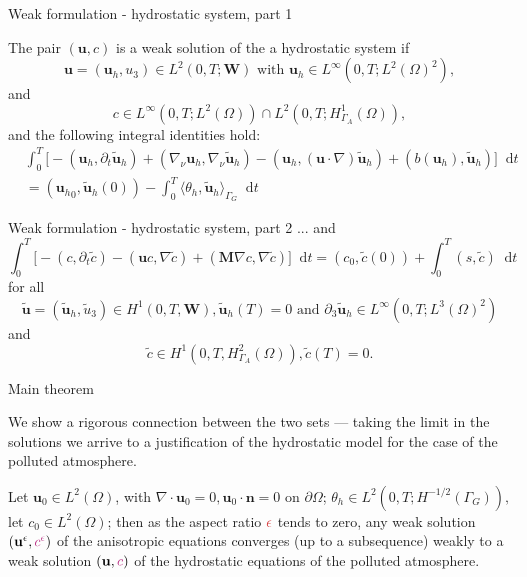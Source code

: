\documentclass{beamer}
\newcommand*\diff{\mathop{}\!\mathrm{d}}
\begin{document}
\begin{frame}{Weak formulation - hydrostatic system, part 1}

The pair $(\mathbf{u}, c)$ is a weak solution of the a hydrostatic system if
$$\mathbf{u} = (\mathbf{u}_h, u_3) \in L^2 (0, T; \mathbf{W}) \text{ with } \mathbf{u}_h \in L^\infty (0,T; L^2(\Omega)^2),$$
and
$$c \in L^\infty(0,T; L^2(\Omega)) \cap L^2(0,T; H^1_{\Gamma_A}(\Omega)),$$ and the following integral identities hold:
%
\begin{equation} \nonumber
\begin{split}
& \int_0^T \bigg[ -(\mathbf{u}_h, \partial_t \mathbf{\tilde{u}}_h) + (\nabla_\nu \mathbf{u}_h, \nabla_\nu \mathbf{\tilde{u}}_h) - (\mathbf{u}_h, (\mathbf{u} \cdot \nabla) \mathbf{\tilde{u}}_h) + (b(\mathbf{u}_h), \mathbf{\tilde{u}}_h) \bigg ] \diff t \\
& = ({\mathbf{u}_h}_0, \mathbf{\tilde{u}}_h(0)) - \int_0^T \langle \theta_h, \mathbf{\tilde{u}}_h \rangle_{\Gamma_G} \diff t
\end{split}
\end{equation}
%
\end{frame}

\begin{frame}{Weak formulation - hydrostatic system, part 2}
... and
%
\begin{equation} \nonumber
\int_0^T \bigg[ -(c, \partial_t \tilde{c}) -(\mathbf{u}c, \nabla \tilde{c}) +  (\mathbf{M} \nabla c, \nabla \tilde{c}) \bigg ] \diff t = (c_0, \tilde{c}(0)) + \int_0^T (s,\tilde{c}) \diff t
\end{equation}
%
for all
$$\mathbf{\tilde{u}} = (\mathbf{\tilde{u}}_h, \tilde{u}_3) \in H^1 (0,T, \mathbf{W}), \mathbf{\tilde{u}}_h (T) = 0 \text{ and } \partial_3 \mathbf{\tilde{u}}_h \in L^\infty (0, T; L^3 (\Omega)^2)$$
and
$$\tilde{c} \in H^1 (0,T, H^2_{\Gamma_A} (\Omega)), \tilde{c} (T) = 0.$$

\end{frame}

\begin{frame}{Main theorem}

We show a rigorous connection between the two sets --- taking the limit in the solutions we arrive to a justification of the hydrostatic model for the case of the polluted atmosphere.

\begin{theorem}
Let $\mathbf{u}_0 \in L^2 (\Omega)$, with $\nabla \cdot \mathbf{u}_0 = 0, \mathbf{u}_0 \cdot \mathbf{n} = 0$ on $\partial \Omega$; $\theta_h \in L^2(0,T; H^{-1/2}(\Gamma_G)),$ let $c_0 \in L^2 (\Omega)$; then as the aspect ratio $\textcolor{jasper}{\epsilon}$ tends to zero, any weak solution $(\mathbf{u}^\epsilon, \textcolor{mediumred-violet}{c^\epsilon})$ of the anisotropic equations converges (up to a subsequence) weakly to a weak solution $(\mathbf{u}, \textcolor{mediumred-violet}{c})$ of the hydrostatic equations of the polluted atmosphere.
\end{theorem}
  
\end{frame}
\end{document}
